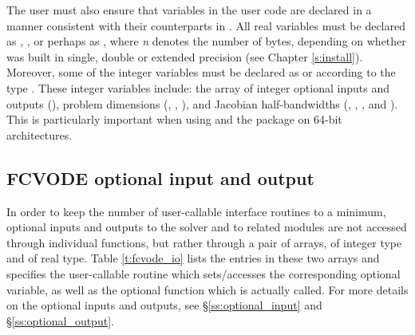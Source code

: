 The user must also ensure that variables in the user {\F} code are
declared in a manner consistent with their counterparts in {\cvode}.
All real variables must be declared as , ,
or perhaps as , where {\em n} denotes the number of bytes,
depending on whether {\cvode} was built in single, double or extended precision 
(see Chapter \ref{s:install}). Moreover, some of the {\F} integer variables
must be declared as  or  according to the 
{\C} type . These integer variables include: the array
of integer optional inputs and outputs (), problem dimensions (,
, ), and Jacobian half-bandwidths (, ,
, and ). This is particularly important when using
{\cvode} and the {\fcvode} package on 64-bit architectures.

\subsection{FCVODE optional input and output}

In order to keep the number of user-callable {\fcvode} interface routines to
a minimum, optional inputs and outputs to the {\cvode} solver and to related 
modules are not accessed through individual functions, but rather through a
pair of arrays,  of integer type and  of real type.
Table \ref{t:fcvode_io} lists the entries in these two arrays and specifies the
{\fcvode} user-callable routine which sets/accesses the corresponding optional
variable, as well as the {\cvode} optional function which is actually called.
For more details on the optional inputs and outputs, see \S\ref{ss:optional_input}
and \S\ref{ss:optional_output}.

